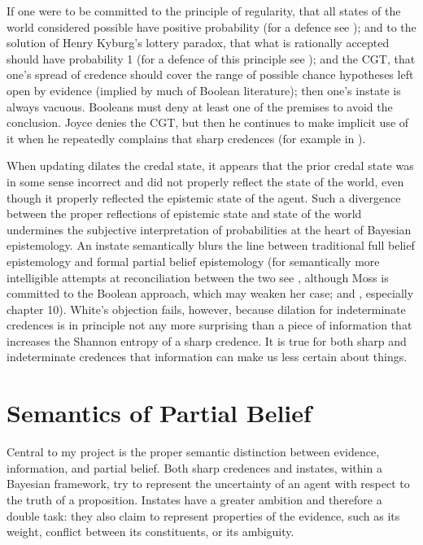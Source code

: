 \addtocounter{expls}{1}


If one were to be committed to the principle of
regularity, that all states of the world considered
possible have positive probability (for a defence see
); and to the solution of
Henry Kyburg's lottery paradox, that what is rationally
accepted should have probability 1 (for a defence of
this principle see );
and the CGT, that one's spread of credence should cover
the range of possible chance hypotheses left open by
evidence (implied by much of Boolean literature); then
one's instate is always vacuous. Booleans must deny at
least one of the premises to avoid the conclusion.
Joyce denies the CGT, but then he continues to make
implicit use of it when he repeatedly complains that
sharp credences  (for example in ).

When updating dilates the credal state, it appears that
the prior credal state was in some sense incorrect and
did not properly reflect the state of the world, even
though it properly reflected the epistemic state of the
agent. Such a divergence between the proper reflections
of epistemic state and state of the world undermines
the subjective interpretation of probabilities at the
heart of Bayesian epistemology. An instate semantically
blurs the line between traditional full belief
epistemology and formal partial belief epistemology
(for semantically more intelligible attempts at
reconciliation between the two see ,
although Moss is committed to the Boolean approach,
which may weaken her case; and ,
especially chapter 10). White's objection fails,
however, because dilation for indeterminate credences
is in principle not any more surprising than a piece of
information that increases the Shannon entropy of a
sharp credence. It is true for both sharp and
indeterminate credences that information can make us
less certain about things.

\section{Semantics of Partial Belief}
\label{SemanticsOfPartialBelief}
Central to my project is the proper semantic
distinction between evidence, information, and partial
belief. Both sharp credences and instates, within a
Bayesian framework, try to represent the uncertainty of
an agent with respect to the truth of a proposition.
Instates have a greater ambition and therefore a double
task: they also claim to represent properties of the
evidence, such as its weight, conflict between its
constituents, or its ambiguity.

